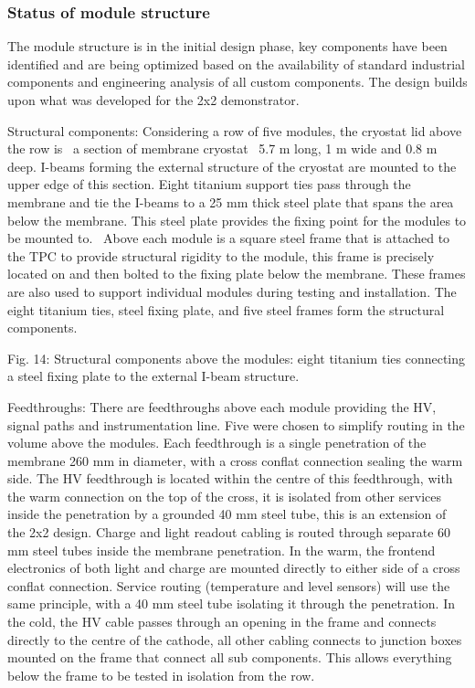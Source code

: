 \subsubsection{Status of module structure}
The module structure is in the initial design phase, key components have been identified and are being optimized based on the availability of standard industrial components and engineering analysis of all custom components. 
The design builds upon what was developed for the 2x2 demonstrator. 

Structural components: Considering a row of five modules, the cryostat lid above the row is  a section of membrane cryostat  5.7 m long, 1 m wide and 0.8 m deep. I-beams forming the external structure of the cryostat are mounted to the upper edge of this section. Eight titanium support ties pass through the membrane and tie the I-beams to a 25 mm thick steel plate that spans the area below the membrane. This steel plate provides the fixing point for the modules to be mounted to.  Above each module is a square steel frame that is attached to the TPC to provide structural rigidity to the module, this frame is precisely located on and then bolted to the fixing plate below the membrane. These frames are also used to support individual modules during testing and installation. The eight titanium ties, steel fixing plate, and five steel frames form the structural components. 

Fig. 14: Structural components above the modules: eight titanium ties connecting a steel fixing plate to the external I-beam structure.

Feedthroughs: There are feedthroughs above each module providing the HV, signal paths and instrumentation line. Five were chosen to simplify routing in the volume above the modules. Each feedthrough is a single penetration of the membrane 260 mm in diameter, with a cross conflat connection sealing the warm side. The HV feedthrough is located within the centre of this feedthrough, with the warm connection on the top of the cross, it is isolated from other services inside the penetration by a grounded 40 mm steel tube, this is an extension of the 2x2 design. Charge and light readout cabling is routed through separate 60 mm steel tubes inside the membrane penetration. In the warm, the frontend electronics of both light and charge are mounted directly to either side of a cross conflat connection. Service routing (temperature and level sensors) will use the same principle, with a 40 mm steel tube isolating it through the penetration. In the cold, the HV cable passes through an opening in the frame and connects directly to the centre of the cathode, all other cabling connects to junction boxes mounted on the frame that connect all sub components. This allows everything below the frame to be tested in isolation from the row.

